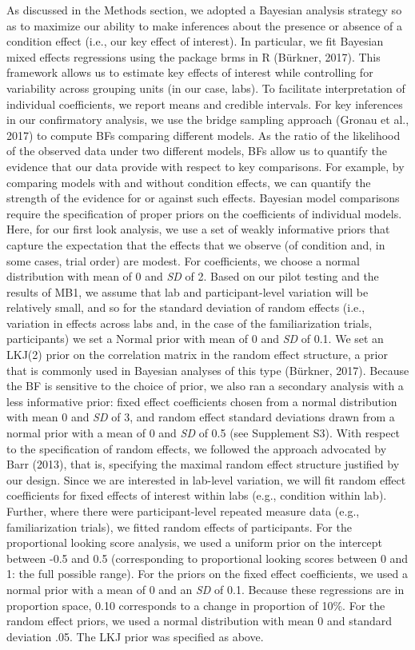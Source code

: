 \documentclass[
  man,floatsintext]{apa6}
\begin{document}
As discussed in the Methods section, we adopted a Bayesian analysis strategy so as to maximize our ability to make inferences about the presence or absence of a condition effect (i.e., our key effect of interest). In particular, we fit Bayesian mixed effects regressions using the package brms in R (Bürkner, 2017). This framework allows us to estimate key effects of interest while controlling for variability across grouping units (in our case, labs).
To facilitate interpretation of individual coefficients, we report means and credible intervals. For key inferences in our confirmatory analysis, we use the bridge sampling approach (Gronau et al., 2017) to compute BFs comparing different models. As the ratio of the likelihood of the observed data under two different models, BFs allow us to quantify the evidence that our data provide with respect to key comparisons. For example, by comparing models with and without condition effects, we can quantify the strength of the evidence for or against such effects.
Bayesian model comparisons require the specification of proper priors on the coefficients of individual models. Here, for our first look analysis, we use a set of weakly informative priors that capture the expectation that the effects that we observe (of condition and, in some cases, trial order) are modest. For coefficients, we choose a normal distribution with mean of 0 and \emph{SD} of 2. Based on our pilot testing and the results of MB1, we assume that lab and participant-level variation will be relatively small, and so for the standard deviation of random effects (i.e., variation in effects across labs and, in the case of the familiarization trials, participants) we set a Normal prior with mean of 0 and \emph{SD} of 0.1. We set an LKJ(2) prior on the correlation matrix in the random effect structure, a prior that is commonly used in Bayesian analyses of this type (Bürkner, 2017). Because the BF is sensitive to the choice of prior, we also ran a secondary analysis with a less informative prior: fixed effect coefficients chosen from a normal distribution with mean 0 and \emph{SD} of 3, and random effect standard deviations drawn from a normal prior with a mean of 0 and \emph{SD} of 0.5 (see Supplement S3). With respect to the specification of random effects, we followed the approach advocated by Barr (2013), that is, specifying the maximal random effect structure justified by our design. Since we are interested in lab-level variation, we will fit random effect coefficients for fixed effects of interest within labs (e.g., condition within lab). Further, where there were participant-level repeated measure data (e.g., familiarization trials), we fitted random effects of participants.
For the proportional looking score analysis, we used a uniform prior on the intercept between -0.5 and 0.5 (corresponding to proportional looking scores between 0 and 1: the full possible range). For the priors on the fixed effect coefficients, we used a normal prior with a mean of 0 and an \emph{SD} of 0.1. Because these regressions are in proportion space, 0.10 corresponds to a change in proportion of 10\%. For the random effect priors, we used a normal distribution with mean 0 and standard deviation .05. The LKJ prior was specified as above.
\end{document}
